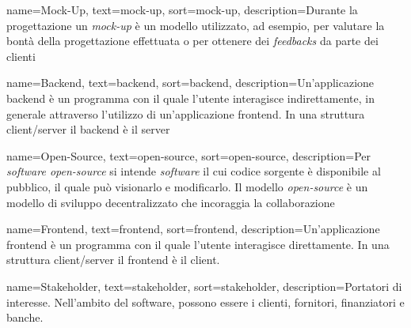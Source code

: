 
{
    name=Mock-Up,
    text=mock-up,
    sort=mock-up,
    description={Durante la progettazione un \emph{mock-up} è un modello utilizzato, ad esempio, per valutare la bontà della progettazione effettuata o per ottenere dei \emph{feedbacks} da parte dei clienti}
}

{
    name=Backend,
    text=backend,
    sort=backend,
    description={Un'applicazione backend è un programma con il quale l'utente interagisce indirettamente, in generale attraverso l'utilizzo di un'applicazione \gls{frontend}. In una struttura client/server il backend è il server}
}

{
    name=Open-Source,
    text=open-source,
    sort=open-source,
    description={Per \emph{software open-source} si intende \emph{software} il cui codice sorgente è disponibile al pubblico, il quale può visionarlo e modificarlo. Il modello \emph{open-source} è un modello di sviluppo decentralizzato che incoraggia la collaborazione}
}

{
    name=Frontend,
    text=frontend,
    sort=frontend,
    description={Un'applicazione frontend è un programma con il quale l'utente interagisce direttamente. In una struttura client/server il frontend è il client.}
}

{
    name=Stakeholder,
    text=stakeholder,
    sort=stakeholder,
    description={Portatori di interesse. Nell’ambito del software, possono essere i clienti, fornitori, finanziatori e banche.}
}

